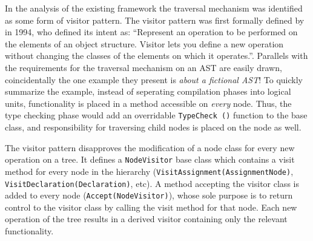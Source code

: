 \documentclass[twoside,openright]{uva-bachelor-thesis}
\newcommand{\code}[1]{\texttt{\footnotesize#1}}
\begin{document}
		In the analysis of the existing framework the traversal mechanism was identified as some form of visitor pattern. The visitor pattern was first formally defined by \citeauthor{gof1994} in 1994, who defined its intent as: ``Represent an operation to be performed on the elements of an object structure. Visitor lets you define a new operation without changing the classes of the elements on which it operates.''. Parallels with the requirements for the traversal mechanism on an AST are easily drawn, coincidentally the one example they present is \emph{about a fictional AST}! To quickly summarize the example, instead of seperating compilation phases into logical units, functionality is placed in a method accessible on \emph{every} node. Thus, the type checking phase would add an overridable \code{TypeCheck ()} function to the base class, and responsibility for traversing child nodes is placed on the node as well.
		
		The visitor pattern disapproves the modification of a node class for every new operation on a tree. It defines a \code{NodeVisitor} base class which contains a visit method for every node in the hierarchy (\code{VisitAssignment(AssignmentNode)}, \code{VisitDeclaration(Declaration)}, etc). A method accepting the visitor class is added to every node (\code{Accept(NodeVisitor)}), whose sole purpose is to return control to the visitor class by calling the visit method for that node. Each new operation of the tree results in a derived visitor containing only the relevant functionality.
		

		
\end{document}
